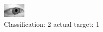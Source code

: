 \begin{figure}[h!]
\begin{center}
\includegraphics[width=0.60\columnwidth]{figures/ID2741_class_2_target_1.png}
\end{center}
\caption{ Classification: 2 actual target: 1}
\label{fig:ID2741_class_2_target_1}
\end{figure}
